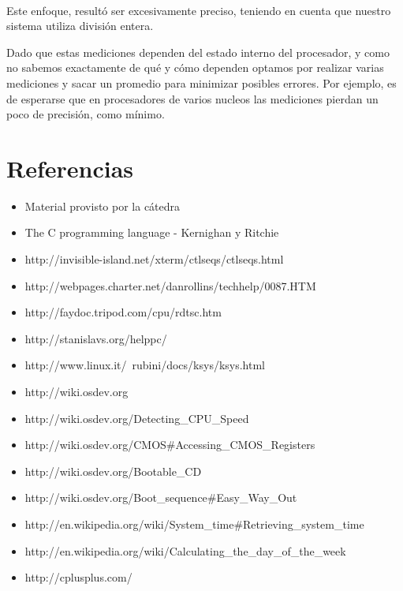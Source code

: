 \documentclass[a4paper,10pt]{article}
\begin{document}
    \paragraph*{}   
    Este enfoque, resultó ser excesivamente preciso, teniendo en cuenta que nuestro sistema utiliza división entera.

    Dado que estas mediciones dependen del estado interno del procesador, y como no sabemos exactamente de qué y cómo dependen optamos por realizar varias mediciones
    y sacar un promedio para minimizar posibles errores. Por ejemplo, es de esperarse que en procesadores de varios nucleos las mediciones
    pierdan un poco de precisión, como mínimo.

\newpage     
\section{Referencias}

\begin{itemize}
  \item Material provisto por la cátedra
  \item The C programming language - Kernighan y Ritchie
  \item http://invisible-island.net/xterm/ctlseqs/ctlseqs.html
  \item http://webpages.charter.net/danrollins/techhelp/0087.HTM
  \item http://faydoc.tripod.com/cpu/rdtsc.htm
  \item http://stanislavs.org/helppc/
  \item http://www.linux.it/~rubini/docs/ksys/ksys.html
  \item http://wiki.osdev.org
  \item http://wiki.osdev.org/Detecting\_CPU\_Speed
  \item	http://wiki.osdev.org/CMOS\#Accessing\_CMOS\_Registers
  \item http://wiki.osdev.org/Bootable\_CD
  \item http://wiki.osdev.org/Boot\_sequence\#Easy\_Way\_Out
  \item http://en.wikipedia.org/wiki/System\_time\#Retrieving\_system\_time
  \item http://en.wikipedia.org/wiki/Calculating\_the\_day\_of\_the\_week
  \item http://cplusplus.com/

\end{itemize}
   
\end{document}
